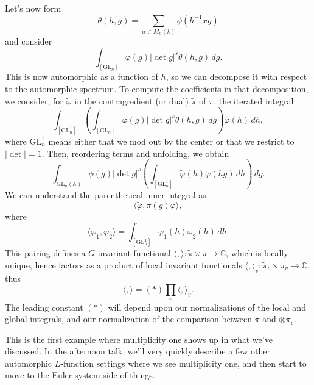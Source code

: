 \documentclass[reqno]{amsart} 
\begin{document}
Let's now form
\begin{equation*}
  \theta(h, g) = \sum_{\alpha \in M_n(k)} \phi(h^{-1} x g)
\end{equation*}
and consider
\begin{equation*}
  \int_{[\mathrm{GL}_n]} \varphi(g) \lvert \det g \rvert^s \theta(h, g) \, d g.
\end{equation*}
This is now automorphic as a function of $h$, so we can decompose it with respect to the automorphic spectrum.  To compute the coefficients in that decomposition, we consider, for $\tilde{\varphi}$ in the contragredient (or dual) $\tilde{\pi}$ of $\pi$, the iterated integral
\begin{equation*}
  \int_{[\mathrm{GL}_n^1]}
  \left(  \int_{[\mathrm{GL}_n]} \varphi(g) \lvert \det g \rvert^s \theta(h, g) \, d g \right)
  \tilde{\varphi}(h) \, d h,
\end{equation*}
where $\mathrm{GL}_n^1$ means either that we mod out by the center or that we restrict to $\lvert \det \rvert = 1$.  Then, reordering terms and unfolding, we obtain
\begin{equation*}
  \int_{\mathrm{GL}_n(\mathbb{A})} \phi(g) \lvert \det g \rvert^s
  \left( \int_{[\mathrm{GL}_n^1]} \tilde{\varphi}(h)
    \varphi(h g) \,d h
  \right) \, d g.
\end{equation*}
We can understand the parenthetical inner integral as
\begin{equation*}
  \langle \tilde{\varphi}, \pi(g) \varphi \rangle,
\end{equation*}
where
\begin{equation*}
  \langle \varphi_1, \varphi_2 \rangle = \int_{[\mathrm{GL}_n^1]} \varphi_1(h) \varphi_2(h) \, d h.
\end{equation*}
This pairing defines a $G$-invariant functional $\langle , \rangle :  \tilde{\pi} \times \pi \rightarrow \mathbb{C}$, which is locally unique, hence factors as a product of local invariant functionals $\langle , \rangle_v : \tilde{\pi}_v \times \pi_v \rightarrow \mathbb{C}$, thus
\begin{equation*}
  \langle , \rangle =(\ast) \prod_v \langle , \rangle_v.
\end{equation*}
The leading constant $(\ast)$ will depend upon our normalizations of the local and global integrals, and our normalization of the comparison between $\pi$ and $\otimes \pi_v$.

This is the first example where multiplicity one shows up in what we've discussed.  In the afternoon talk, we'll very quickly describe a few other automorphic $L$-function settings where we see multiplicity one, and then start to move to the Euler system side of things.
\end{document}

